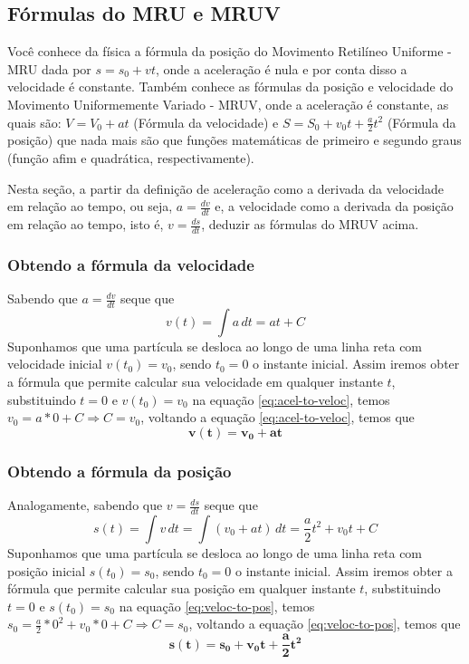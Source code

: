 \cleardoublepage\documentclass[../main.tex]{subfiles}
\begin{document}
\subsection{Fórmulas do MRU e MRUV}
Você conhece da física a fórmula da posição do Movimento Retilíneo Uniforme - MRU dada por $s=s_0+vt$, onde a aceleração é nula e por conta disso a velocidade é constante. Também conhece as fórmulas da posição e velocidade do Movimento Uniformemente Variado - MRUV, onde a aceleração é constante, as quais são: $V=V_0+at$ (Fórmula da velocidade) e $S=S_0+v_0t+\frac{a}{2}t^2$ (Fórmula da posição) que nada mais são que funções matemáticas de primeiro e segundo graus (função afim e quadrática, respectivamente).

Nesta seção, a partir da definição de aceleração como a derivada da velocidade em relação ao tempo, ou seja, $a=\frac{dv}{dt}$ e, a velocidade como a derivada da posição em relação ao tempo, isto é, $v=\frac{ds}{dt}$, deduzir as fórmulas do MRUV acima.
\subsubsection*{Obtendo a fórmula da velocidade}
Sabendo que $a=\frac{dv}{dt}$ seque que
\begin{equation}
    v(t)=\int a\, dt=at+C\label{eq:acel-to-veloc}
\end{equation}
Suponhamos que uma partícula se desloca ao longo de uma linha reta com velocidade inicial $v(t_0)=v_0$,  sendo $t_0=0$ o instante inicial. Assim iremos obter a fórmula que permite calcular sua velocidade em qualquer instante $t$, substituindo $t=0$ e $v(t_0)=v_0$ na equação \eqref{eq:acel-to-veloc}, temos $v_0=a*0+C\Rightarrow C=v_0$, voltando a equação \eqref{eq:acel-to-veloc}, temos que 
\begin{equation}
 \boldsymbol{ v(t)=v_0+at  }
\end{equation}

\subsubsection*{Obtendo a fórmula da posição}
Analogamente, sabendo que $v=\frac{ds}{dt}$ seque que
\begin{equation}
    s(t)=\int v\, dt=\int (v_0+at)\,dt=\frac{a}{2}t^2+v_0t+C\label{eq:veloc-to-pos}
\end{equation}
Suponhamos que uma partícula se desloca ao longo de uma linha reta com posição inicial $s(t_0)=s_0$,  sendo $t_0=0$ o instante inicial. Assim iremos obter a fórmula que permite calcular sua posição em qualquer instante $t$, substituindo $t=0$ e $s(t_0)=s_0$ na equação \eqref{eq:veloc-to-pos}, temos $s_0=\frac{a}{2}*0^2+v_0*0+C\Rightarrow C=s_0$, voltando a equação \eqref{eq:veloc-to-pos}, temos que 
\begin{equation}
  \boldsymbol{s(t)=s_0+v_0t+\frac{a}{2}t^2  }
\end{equation}
\end{document}
